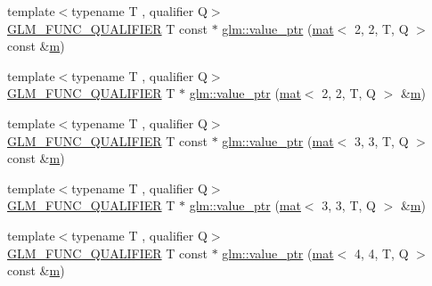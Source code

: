 \begin{DoxyCompactItemize}
{\footnotesize template$<$typename T , qualifier Q$>$ }\\\mbox{\hyperlink{setup_8hpp_a33fdea6f91c5f834105f7415e2a64407}{G\+L\+M\+\_\+\+F\+U\+N\+C\+\_\+\+Q\+U\+A\+L\+I\+F\+I\+ER}} T const  $\ast$ \mbox{\hyperlink{group__gtc__type__ptr_ga6144a4839923074f038b63506b855faf}{glm\+::value\+\_\+ptr}} (\mbox{\hyperlink{structglm_1_1mat}{mat}}$<$ 2, 2, T, Q $>$ const \&\mbox{\hyperlink{_s_d_l__opengl__glext_8h_af593500c283bf1a787a6f947f503a5c2}{m}})
\item 
{\footnotesize template$<$typename T , qualifier Q$>$ }\\\mbox{\hyperlink{setup_8hpp_a33fdea6f91c5f834105f7415e2a64407}{G\+L\+M\+\_\+\+F\+U\+N\+C\+\_\+\+Q\+U\+A\+L\+I\+F\+I\+ER}} T $\ast$ \mbox{\hyperlink{group__gtc__type__ptr_gac636dcc35b194f5e950a3d0fb9ef44ef}{glm\+::value\+\_\+ptr}} (\mbox{\hyperlink{structglm_1_1mat}{mat}}$<$ 2, 2, T, Q $>$ \&\mbox{\hyperlink{_s_d_l__opengl__glext_8h_af593500c283bf1a787a6f947f503a5c2}{m}})
\item 
{\footnotesize template$<$typename T , qualifier Q$>$ }\\\mbox{\hyperlink{setup_8hpp_a33fdea6f91c5f834105f7415e2a64407}{G\+L\+M\+\_\+\+F\+U\+N\+C\+\_\+\+Q\+U\+A\+L\+I\+F\+I\+ER}} T const  $\ast$ \mbox{\hyperlink{group__gtc__type__ptr_gad80f09b66c6f11043ea79e506d141594}{glm\+::value\+\_\+ptr}} (\mbox{\hyperlink{structglm_1_1mat}{mat}}$<$ 3, 3, T, Q $>$ const \&\mbox{\hyperlink{_s_d_l__opengl__glext_8h_af593500c283bf1a787a6f947f503a5c2}{m}})
\item 
{\footnotesize template$<$typename T , qualifier Q$>$ }\\\mbox{\hyperlink{setup_8hpp_a33fdea6f91c5f834105f7415e2a64407}{G\+L\+M\+\_\+\+F\+U\+N\+C\+\_\+\+Q\+U\+A\+L\+I\+F\+I\+ER}} T $\ast$ \mbox{\hyperlink{group__gtc__type__ptr_ga7bafdd942876d208a5fc34faa4518c36}{glm\+::value\+\_\+ptr}} (\mbox{\hyperlink{structglm_1_1mat}{mat}}$<$ 3, 3, T, Q $>$ \&\mbox{\hyperlink{_s_d_l__opengl__glext_8h_af593500c283bf1a787a6f947f503a5c2}{m}})
\item 
{\footnotesize template$<$typename T , qualifier Q$>$ }\\\mbox{\hyperlink{setup_8hpp_a33fdea6f91c5f834105f7415e2a64407}{G\+L\+M\+\_\+\+F\+U\+N\+C\+\_\+\+Q\+U\+A\+L\+I\+F\+I\+ER}} T const  $\ast$ \mbox{\hyperlink{group__gtc__type__ptr_ga72565b63af29f056843ecd4956b3c738}{glm\+::value\+\_\+ptr}} (\mbox{\hyperlink{structglm_1_1mat}{mat}}$<$ 4, 4, T, Q $>$ const \&\mbox{\hyperlink{_s_d_l__opengl__glext_8h_af593500c283bf1a787a6f947f503a5c2}{m}})
\item 

\end{DoxyCompactItemize}
